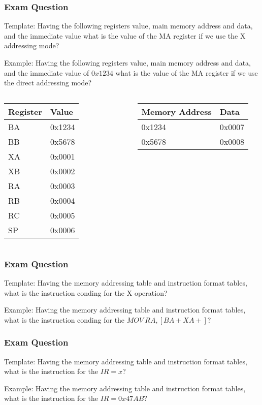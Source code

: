 \begin{frame}
    \frametitle{Exam Question}
    Template: Having the following registers value, main memory address and data, and the immediate value what is the value of the MA register if we use the X addressing mode?

    Example: Having the following registers value, main memory address and data, and the immediate value of $0x1234$ what is the value of the MA register if we use the direct addressing mode?
    
    \begin{columns}
    \begin{table}[]
        \begin{tabular}{|l|l|}
            \hline
            \textbf{Register} & \textbf{Value} \\ \hline
            BA & 0x1234 \\ \hline
            BB & 0x5678 \\ \hline
            XA & 0x0001 \\ \hline
            XB & 0x0002 \\ \hline
            RA & 0x0003 \\ \hline
            RB & 0x0004 \\ \hline
            RC & 0x0005 \\ \hline
            SP & 0x0006 \\ \hline
        \end{tabular}
    \end{table}

    \begin{table}[]
        \begin{tabular}{|l|l|}
            \hline
            \textbf{Memory Address} & \textbf{Data} \\ \hline
            0x1234 & 0x0007 \\ \hline
            0x5678 & 0x0008 \\ \hline
        \end{tabular}
    \end{table}
    \end{columns}
\end{frame}


\begin{frame}
    \frametitle{Exam Question}
    Template: Having the memory addressing table and instruction format tables, what is the instruction conding for the X operation?

    Example: Having the memory addressing table and instruction format tables, what is the instruction conding for the $MOV\ RA, [BA+XA+]$?
\end{frame}


\begin{frame}
    \frametitle{Exam Question}
    Template: Having the memory addressing table and instruction format tables, what is the instruction for the $IR=x$?

    Example: Having the memory addressing table and instruction format tables, what is the instruction for the $IR=0x47AB$?
\end{frame}